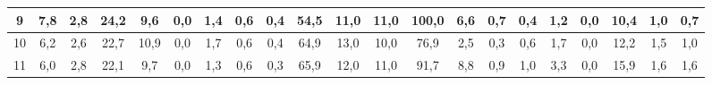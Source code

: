\begin{sidewaystable}[]
\begin{tabular}{|c|c|c|c|c|c|c|c|c|c|c|c|c|c|c|c|c|c|c|c|c|}
    9  & 7,8                                              & 2,8                                              & 24,2                                             & 9,6                                              & 0,0                                              & 1,4                                              & 0,6                                              & 0,4                                              & 54,5                                            & 11,0                                            & 11,0                                            & 100,0                                           & 6,6                                             & 0,7                                             & 0,4                                             & 1,2                                             & 0,0                                             & 10,4                                             & 1,0                                              &  0,7                                               \\ \hline
    10 & 6,2                                              & 2,6                                              & 22,7                                             & 10,9                                             & 0,0                                              & 1,7                                              & 0,6                                              & 0,4                                              & 64,9                                            & 13,0                                            & 10,0                                            & 76,9                                            & 2,5                                             & 0,3                                             & 0,6                                             & 1,7                                             & 0,0                                             & 12,2                                             & 1,5                                              &  1,0                                               \\ \hline
    11 & 6,0                                              & 2,8                                              & 22,1                                             & 9,7                                              & 0,0                                              & 1,3                                              & 0,6                                              & 0,3                                              & 65,9                                            & 12,0                                            & 11,0                                            & 91,7                                            & 8,8                                             & 0,9                                             & 1,0                                             & 3,3                                             & 0,0                                             & 15,9                                             & 1,6                                              &  1,6                                               \\ \hline

\end{tabular}
\end{sidewaystable}
